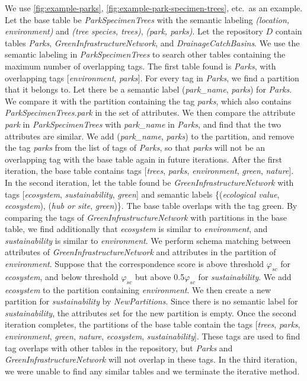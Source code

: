 We use \autoref{fig:example-parks}, \autoref{fig:example-park-specimen-trees}, etc.~as an example. Let the base table be \textit{ParkSpecimenTrees} with the semantic labeling \textit{(location, environment)} and \textit{(tree species, trees)}, \textit{(park, parks)}. Let the repository $D$ contain tables \textit{Parks}, \textit{GreenInfrastructureNetwork}, and \textit{DrainageCatchBasins}. We use the semantic labeling in \textit{ParkSpecimenTrees} to search other tables containing the maximum number of overlapping tags. The first table found is \textit{Parks}, with overlapping tags [\textit{environment}, \textit{parks}]. For every tag in \textit{Parks}, we find a partition that it belongs to. Let there be a semantic label (\textit{park\_name}, \textit{parks}) for \textit{Parks}. We compare it with the partition containing the tag \textit{parks}, which also contains \textit{ParkSpecimenTrees.park} in the set of attributes. We then compare the attribute \textit{park} in \textit{ParkSpecimenTrees} with \textit{park\_name} in \textit{Parks}, and find that the two attributes are similar. We add (\textit{park\_name}, \textit{parks}) to the partition, and remove the tag \textit{parks} from the list of tags of \textit{Parks}, so that \textit{parks} will not be an overlapping tag with the base table again in future iterations. After the first iteration, the base table contains tags [\textit{trees}, \textit{parks}, \textit{environment}, \textit{green}, \textit{nature}]. In the second iteration, let the table found be \textit{GreenInfrastructureNetwork} with tags [\textit{ecosystem}, \textit{sustainability}, \textit{green}] and semantic labels \{(\textit{ecological value}, \textit{ecosystem}), (\textit{hub or site}, \textit{green})\}. The base table overlaps with the tag green. By comparing the tags of \textit{GreenInfrastructureNetwork} with partitions in the base table, we find additionally that \textit{ecosystem} is similar to \textit{environment}, and \textit{sustainability} is similar to \textit{environment}. We perform schema matching between attributes of \textit{GreenInfrastructureNetwork} and attributes in the partition of \textit{environment}. Suppose that the correspondence score is above threshold $\ensuremath{\varphi}_{sc}$ for \textit{ecosystem}, and below threshold $\ensuremath{\varphi}_{sc}$ but above 0.5$\ensuremath{\varphi}_{sc}$ for \textit{sustainability}. We add \textit{ecosystem} to the partition containing \textit{environment}. We then create a new partition for \textit{sustainability} by \textit{NewPartitions}. Since there is no semantic label for \textit{sustainability}, the attributes set for the new partition is empty. Once the second iteration completes, the partitions of the base table contain the tags [\textit{trees}, \textit{parks}, \textit{environment}, \textit{green}, \textit{nature}, \textit{ecosystem}, \textit{sustainability}]. These tags are used to find tag overlaps with other tables in the repository, but \textit{Parks} and \textit{GreenInfrastructureNetwork} will not overlap in these tags. In the third iteration, we were unable to find any similar tables and we terminate the iterative method.

